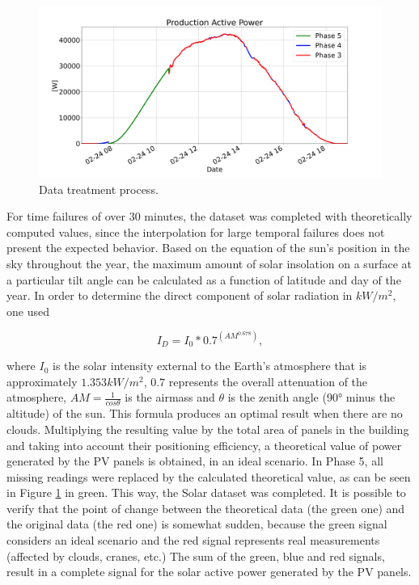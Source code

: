 \begin{figure}[h!]
    \centering
    \begin{center}
    \includegraphics[width=1\textwidth]{Images/int0.png}
    \caption{Data treatment process.}
    \label{int0}
    \end{center}
\end{figure}





For time failures of over 30 minutes, the dataset was completed with theoretically computed values, since the interpolation for large temporal failures does not present the expected behavior.
Based on the equation of the sun's position in the sky throughout the year, the maximum amount of solar insolation on a surface at a particular tilt angle can be calculated as a function of latitude and day of the year\cite{solar0}. In order to determine the direct component of solar radiation in $kW/m^2$, one used


\begin{equation}
     I_D = I_0*0.7^{(AM^{0.678})},
\label{solar}
\end{equation}

where $I_0$ is the solar intensity external to the Earth's atmosphere that is approximately $1.353 kW/m^2$, $0.7$ represents the overall attenuation of the atmosphere, $AM = \frac{1}{cos\theta}$ is the airmass and $\theta$ is the zenith angle (90° minus the altitude) of the sun. This formula produces an optimal result when there are no clouds. Multiplying the resulting value by the total area of panels in the building and taking into account their positioning efficiency, a theoretical value of power generated by the \ac{PV} panels is obtained, in an ideal scenario. In Phase 5, all missing readings were replaced by the calculated theoretical value, as can be seen in Figure \ref{int0} in green. This way, the Solar dataset was completed. It is possible to verify that the point of change between the theoretical data (the green one) and the original data (the red one) is somewhat sudden, because the green signal considers an ideal scenario and the red signal represents real measurements (affected by clouds, cranes, etc.) The sum of the green, blue and red signals, result in a complete signal for the solar active power generated by the \ac{PV} panels.


